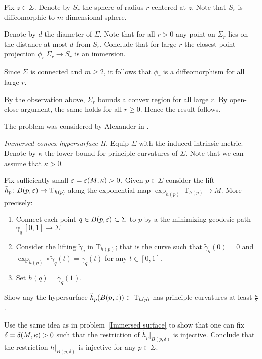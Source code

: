 Fix $z\in \Sigma$.
Denote by $S_r$ the sphere of radius $r$ centered at $z$.
Note that $S_r$ is diffeomorphic to $m$-dimensional sphere.

Denote by $d$ the diameter of $\Sigma$.
Note that for all $r>0$
any point on $\Sigma_r$
lies on the distance at most $d$ from $S_r$.
Conclude that for large $r$ the closest point projection $\phi_r\:\Sigma_r\to S_r$ is an immersion.


Since $\Sigma$ is connected
and $m\ge 2$, it follows that $\phi_r$ is a diffeomorphism for all large $r$.

By the observation above, $\Sigma_r$ bounds a convex region for all large $r$.
By open-close argument, the same holds for all $r\ge 0$.
Hence the result follows.

The problem was considered by Alexander in \cite{alexander}.



\textit{Immersed convex hypersurface {\rm II}.}
Equip $\Sigma$ with the induced intrinsic metric.
Denote by $\kappa$ the lower bound for principle curvatures of $\Sigma$.
Note that we can assume that $\kappa>0$.

Fix sufficiently small $\varepsilon=\varepsilon(M,\kappa)>0$.
Given $p\in \Sigma$ consider the lift $\tilde h_p\colon B(p,\varepsilon)\to \mathrm{T}_{h(p)}$ along the exponential map $\exp_{h(p)}\:\mathrm{T}_{h(p)}\to M$.
More precisely:
\begin{enumerate}
\item Connect each point $q\in B(p,\varepsilon)\subset \Sigma$ to $p$
by a the minimizing geodesic  path $\gamma_q\:[0,1]\to \Sigma$
\item Consider the lifting $\tilde\gamma_q$ in $\mathrm{T}_{h(p)}$; 
that is the curve such that $\tilde\gamma_q(0)=0$ and $\exp_{h(p)}\circ\tilde\gamma_q(t)=\gamma_q(t)$ for any $t\in[0,1]$.
 \item Set $\tilde h(q)=\tilde\gamma_q(1)$.
\end{enumerate}

Show any the hypersurface $\tilde h_p(B(p,\varepsilon))\subset \mathrm{T}_{h(p)}$ has principle curvatures at least $\tfrac\kappa2$.

Use the same idea as in problem~\ref{Immersed surface} to show that 
one can fix $\delta\z=\delta(M,\kappa)>0$ such that the restriction of $\tilde h_p|_{B(p,\delta)}$ is injective.
Conclude that the restriction $h|_{B(p,\delta)}$ is injective for any $p\in\Sigma$.

